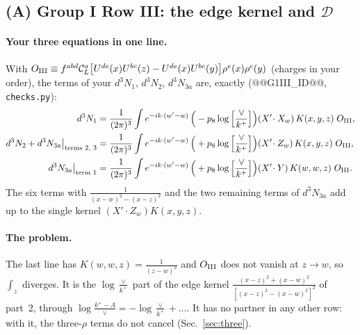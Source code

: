 \documentclass[10pt]{article}
\numberwithin{equation}{section}
\newcommand{\CL}{\mathcal C_L}
\newcommand{\Lv}{\log\Big[\frac{\vee}{k^+}\Big]}
\newcommand{\pre}{\frac{1}{(2\pi)^3}}
\newcommand{\phw}{e^{-ik\cdot(w'-w)}}
\begin{document}
\subsection{(A) Group I Row III: the edge kernel and \texorpdfstring{$\mathcal D$}{D}}\label{sec:A}
\paragraph{Your three equations in one line.} With $O_{\rm III}\equiv f^{abd}\CL^a\big[U^{de}(x)U^{bc}(z)-U^{de}(x)U^{bc}(y)\big]\rho^e(x)\rho^c(y)$ (charges in your order), the terms of your $d^3N_1$, $d^3N_2$, $d^3N_{3a}$ are, exactly (@@G1III_ID@@, \texttt{checks.py}):
\begin{align}
d^3N_1&=\pre\int\phw\,\Big(-p_8\Lv\Big)(X'\!\cdot X_w)\,K(x,y,z)\;O_{\rm III},\notag\\
d^3N_2+d^3N_{3a}\big|_{\text{terms 2, 3}}&=\pre\int\phw\,\Big(+p_8\Lv\Big)(X'\!\cdot Z_w)\,K(x,y,z)\;O_{\rm III},\notag\\
d^3N_{3a}\big|_{\text{term 1}}&=\pre\int\phw\,\Big(+p_8\Lv\Big)(X'\!\cdot Y)\,K(w,w,z)\;O_{\rm III}.
\label{eq:G1III}
\end{align}
The six terms with $\frac{1}{(x-w)^2-(x-z)^2}$ and the two remaining terms of $d^3N_{3a}$ add up to the single kernel $(X'\!\cdot Z_w)K(x,y,z)$.

\paragraph{The problem.} The last line has $K(w,w,z)=\frac1{(z-w)^2}$ and $O_{\rm III}$ does not vanish at $z\to w$, so $\int_z$ diverges. It is the $\log\frac{\vee}{k^+}$ part of the edge kernel $\frac{(x-z)^2+(x-w)^2}{[(x-z)^2-(x-w)^2]^2}$ of part~2, through $\log\frac{k^+-\Lambda}{\vee}=-\log\frac{\vee}{k^+}+\dots$. It has no partner in any other row: with it, the three-$\rho$ terms do not cancel (Sec.~\ref{sec:three}).
\end{document}
